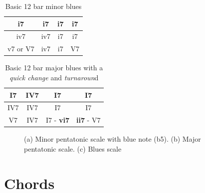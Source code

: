 \documentclass{article}
\begin{document}
\begin{table}[!h]
	\caption{Basic 12 bar minor blues}
	\centering
	\begin{tabular}{| c | c | c | c |}
		\hline
		\phantom{x}i7\phantom{x} & \phantom{x}i7\phantom{x} & \phantom{x}i7\phantom{x} & \phantom{x}i7\phantom{x}  \\
		\hline
		\phantom{x}iv7\phantom{x} & \phantom{x}iv7\phantom{x} & \phantom{x}i7\phantom{x} & \phantom{x}i7\phantom{x}  \\
		\hline
		\phantom{x}v7 or V7\phantom{x} & \phantom{x}iv7\phantom{x} & \phantom{x}i7\phantom{x} & \phantom{x}V7\phantom{x}  \\
		\hline
	\end{tabular}
	\label{tab: }
\end{table}

\begin{table}[!h]
	\caption{Basic 12 bar major blues with a \textit{quick change} and \textit{turnaroun}d}
	\centering
	\begin{tabular}{| c | c | c | c |}
		\hline
		\phantom{x}I7\phantom{x} & \phantom{x}\textbf{IV7}\phantom{x} & \phantom{x}I7\phantom{x} & \phantom{x}I7\phantom{x}  \\
		\hline
		\phantom{x}IV7\phantom{x} & \phantom{x}IV7\phantom{x} & \phantom{x}I7\phantom{x} & \phantom{x}I7\phantom{x}  \\
		\hline
		\phantom{x}V7\phantom{x} & \phantom{x}IV7\phantom{x} & \phantom{x}I7 - \textbf{vi7} & \textbf{ii7} - V7\phantom{x}  \\
		\hline
	\end{tabular}
	\label{tab: }
\end{table}

\begin{figure}[h!]
	\centering
	\hspace*{-1cm}
	\scalebox{0.7}{}
	\hspace*{-1cm}
	\scalebox{0.7}{}
	\hspace*{-1cm}
	\scalebox{0.7}{}
	\caption{(a) Minor pentatonic scale with blue note (b5). (b) Major pentatonic scale. (c) Blues scale  }
	\label{fig:blues_penta_mineur}
\end{figure}

\newpage
\section{Chords}
\end{document}
